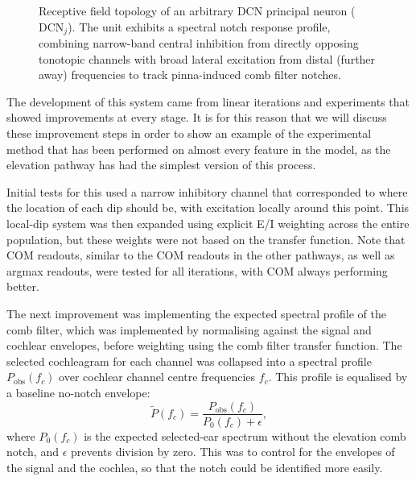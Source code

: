 \begin{figure}[htbp]
    \caption{Receptive field topology of an arbitrary DCN principal neuron ($\text{DCN}_j$). The unit exhibits a spectral notch response profile, combining narrow-band central inhibition from directly opposing tonotopic channels with broad lateral excitation from distal (further away) frequencies to track pinna-induced comb filter notches.}
    \label{fig:dcn_receptive_field}
\end{figure}

The development of this system came from linear iterations and experiments that showed improvements at every stage. It is for this reason that we will discuss these improvement steps in order to show an example of the experimental method that has been performed on almost every feature in the model, as the elevation pathway has had the simplest version of this process.

Initial tests for this used a narrow inhibitory channel that corresponded to where the location of each dip should be, with excitation locally around this point. This local-dip system was then expanded using explicit E/I weighting across the entire population, but these weights were not based on the transfer function. Note that COM readouts, similar to the COM readouts in the other pathways, as well as argmax readouts, were tested for all iterations, with COM always performing better.

The next improvement was implementing the expected spectral profile of the comb filter, which was implemented by normalising against the signal and cochlear envelopes, before weighting using the comb filter transfer function. The selected cochleagram for each channel was collapsed into a spectral profile $P_{\mathrm{obs}}(f_c)$ over cochlear channel centre frequencies $f_c$. This profile is equalised by a baseline no-notch envelope:
\begin{equation}
    \tilde{P}(f_c)
    =
    \frac{
        P_{\mathrm{obs}}(f_c)
    }{
        P_0(f_c)+\epsilon
    },
\end{equation}
where $P_0(f_c)$ is the expected selected-ear spectrum without the elevation comb notch, and $\epsilon$ prevents division by zero. This was to control for the envelopes of the signal and the cochlea, so that the notch could be identified more easily. 

